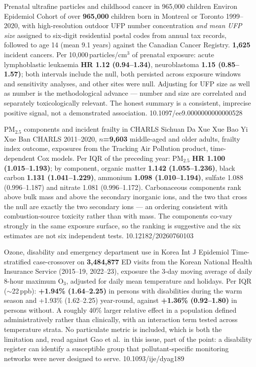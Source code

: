 \documentclass[10pt]{article}
\begin{document}
{Prenatal ultrafine particles and childhood cancer in 965{,}000 children}
{Environ Epidemiol}
{Cohort of over \textbf{965{,}000} children born in Montreal or Toronto 1999--2020, with
high-resolution outdoor UFP number concentration \emph{and mean UFP size} assigned to
six-digit residential postal codes from annual tax records, followed to age 14 (mean 9.1
years) against the Canadian Cancer Registry. \textbf{1{,}625} incident cancers. Per
10{,}000\,particles/cm$^3$ of prenatal exposure: acute lymphoblastic leukaemia
\textbf{HR 1.12 (0.94--1.34)}, neuroblastoma \textbf{1.15 (0.85--1.57)}; both intervals
include the null, both persisted across exposure windows and sensitivity analyses, and
other sites were null. Adjusting for UFP size as well as number is the methodological
advance --- number and size are correlated and separately toxicologically relevant. The
honest summary is a consistent, imprecise positive signal, not a demonstrated association.}
{10.1097/ee9.0000000000000528}

{PM$_{2.5}$ components and incident frailty in CHARLS}
{Sichuan Da Xue Xue Bao Yi Xue Ban}
{CHARLS 2011--2020, \textbf{$n$=9{,}603} middle-aged and older adults, frailty index
outcome, exposures from the Tracking Air Pollution product, time-dependent Cox models. Per
IQR of the preceding year: PM$_{2.5}$ \textbf{HR 1.100 (1.015--1.193)}; by component,
organic matter \textbf{1.142 (1.055--1.236)}, black carbon \textbf{1.131 (1.041--1.229)},
ammonium \textbf{1.098 (1.010--1.194)}, sulfate 1.088 (0.996--1.187) and nitrate 1.081
(0.996--1.172). Carbonaceous components rank above bulk mass and above the secondary
inorganic ions, and the two that cross the null are exactly the two secondary ions ---
an ordering consistent with combustion-source toxicity rather than with mass. The
components co-vary strongly in the same exposure surface, so the ranking is suggestive and
the six estimates are not six independent tests.}
{10.12182/20260760103}

{Ozone, disability and emergency department use in Korea}
{Int J Epidemiol}
{Time-stratified case-crossover on \textbf{3{,}484{,}877} ED visits from the Korean
National Health Insurance Service (2015--19, 2022--23), exposure the 3-day moving average
of daily 8-hour maximum O$_3$, adjusted for daily mean temperature and holidays. Per IQR
($\sim$22\,ppb): \textbf{+1.94\% (1.64--2.25)} in persons with disabilities during the warm
season and +1.93\% (1.62--2.25) year-round, against \textbf{+1.36\% (0.92--1.80)} in
persons without. A roughly 40\% larger relative effect in a population defined
administratively rather than clinically, with an interaction term tested across temperature
strata. No particulate metric is included, which is both the limitation and, read against
Gao et al.\ in this issue, part of the point: a disability register can identify a
susceptible group that pollutant-specific monitoring networks were never designed to
serve.}
{10.1093/ije/dyag189}
\end{document}
